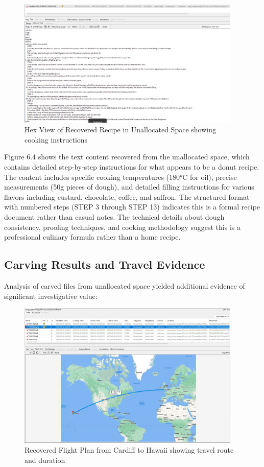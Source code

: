 \begin{figure}[h]
    \centering
    \includegraphics[width=0.95\textwidth]{images/Evidence Examination/Image4.png}
    \caption{Hex View of Recovered Recipe in Unallocated Space showing cooking instructions}
    \label{fig:hex_view}
\end{figure}

Figure 6.4 shows the text content recovered from the unallocated space, which contains detailed step-by-step instructions for what appears to be a donut recipe. The content includes specific cooking temperatures (180°C for oil), precise measurements (50g pieces of dough), and detailed filling instructions for various flavors including custard, chocolate, coffee, and saffron. The structured format with numbered steps (STEP 3 through STEP 13) indicates this is a formal recipe document rather than casual notes. The technical details about dough consistency, proofing techniques, and cooking methodology suggest this is a professional culinary formula rather than a home recipe.

\subsection{Carving Results and Travel Evidence}
Analysis of carved files from unallocated space yielded additional evidence of significant investigative value:

\begin{figure}[h]
    \centering
    \includegraphics[width=0.95\textwidth]{images/Evidence Examination/Image5.png}
    \caption{Recovered Flight Plan from Cardiff to Hawaii showing travel route and duration}
    \label{fig:flight_plan}
\end{figure}

